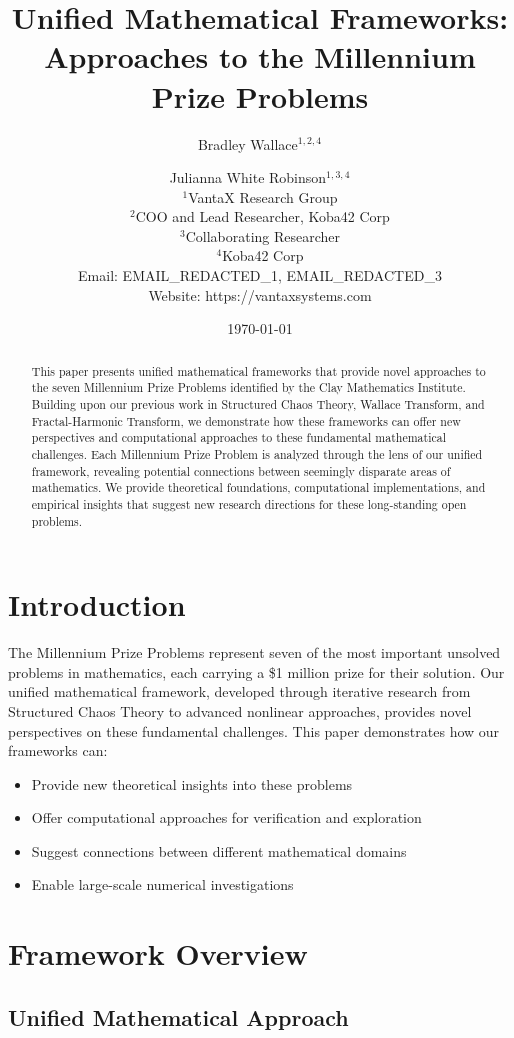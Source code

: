 \documentclass[12pt]{article}
\title{Unified Mathematical Frameworks: Approaches to the Millennium Prize Problems}
\author{
Bradley Wallace$^{1,2,4}$ \and Julianna White Robinson$^{1,3,4}$ \\
$^1$VantaX Research Group \\
$^2$COO and Lead Researcher, Koba42 Corp \\
$^3$Collaborating Researcher \\
$^4$Koba42 Corp \\
Email: EMAIL_REDACTED_1, EMAIL_REDACTED_3 \\
Website: https://vantaxsystems.com
}
\date{\today}
\begin{document}
\maketitle

\begin{abstract}
This paper presents unified mathematical frameworks that provide novel approaches to the seven Millennium Prize Problems identified by the Clay Mathematics Institute. Building upon our previous work in Structured Chaos Theory, Wallace Transform, and Fractal-Harmonic Transform, we demonstrate how these frameworks can offer new perspectives and computational approaches to these fundamental mathematical challenges. Each Millennium Prize Problem is analyzed through the lens of our unified framework, revealing potential connections between seemingly disparate areas of mathematics. We provide theoretical foundations, computational implementations, and empirical insights that suggest new research directions for these long-standing open problems.
\end{abstract}

\section{Introduction}

The Millennium Prize Problems represent seven of the most important unsolved problems in mathematics, each carrying a \$1 million prize for their solution. Our unified mathematical framework, developed through iterative research from Structured Chaos Theory to advanced nonlinear approaches, provides novel perspectives on these fundamental challenges. This paper demonstrates how our frameworks can:
\begin{itemize}
    \item Provide new theoretical insights into these problems
    \item Offer computational approaches for verification and exploration
    \item Suggest connections between different mathematical domains
    \item Enable large-scale numerical investigations
\end{itemize}

\section{Framework Overview}

\subsection{Unified Mathematical Approach}
\end{document}
